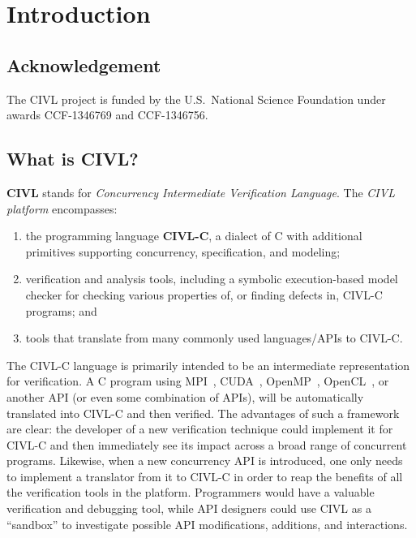 \part{Introduction}
\label{part:intro}

\chapter{Acknowledgement}

The CIVL project is funded by the U.S.\ National Science Foundation
under awards CCF-1346769 and CCF-1346756.

\chapter{What is CIVL?}

\textbf{CIVL} stands for \emph{Concurrency Intermediate Verification
  Language}.   The \emph{CIVL platform} encompasses:
\begin{enumerate}
\item the programming language \textbf{CIVL-C}, a dialect of C with
  additional primitives supporting concurrency, specification, and modeling;
\item verification and 
  analysis tools, including a symbolic execution-based model checker for
  checking various properties of, or finding defects in, CIVL-C
  programs; and
\item tools that translate from many commonly used
  languages/APIs to CIVL-C.
\end{enumerate}

The CIVL-C language is primarily intended to be an intermediate
representation for verification. A C program using
MPI~\cite{mpi-forum:2012:mpi30}, CUDA~\cite{cuda-programming-guide},
OpenMP~\cite{openmp-standard}, OpenCL~\cite{opencl-standard}, or
another API (or even some combination of APIs), will be automatically
translated into CIVL-C and then verified. The advantages of such a
framework are clear: the developer of a new verification technique
could implement it for CIVL-C and then immediately see its impact
across a broad range of concurrent programs. Likewise, when a new
concurrency API is introduced, one only needs to implement a
translator from it to CIVL-C in order to reap the benefits of all the
verification tools in the platform. Programmers would have a valuable
verification and debugging tool, while API designers could use CIVL as
a ``sandbox'' to investigate possible API modifications, additions,
and interactions.

